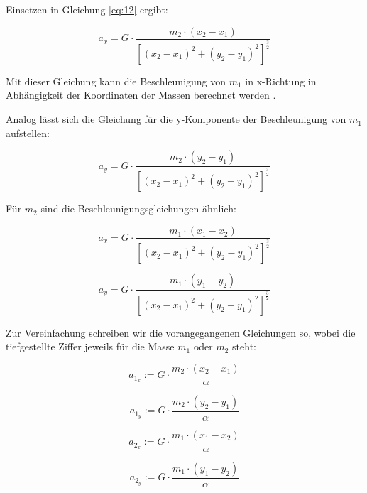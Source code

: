 \documentclass[10pt,twocolumn]{scrartcl}
\begin{document}
Einsetzen in Gleichung \eqref{eq:12} ergibt:

\begin{equation}a_x = G \cdot \frac{m_2 \cdot (x_2 - x_1)}
									{[(x_2-x_1)^2 + (y_2-y_1)^2]^\frac{3}{2}}
\label{eq:14}
\end{equation}

Mit dieser Gleichung kann die Beschleunigung von $m_1$ in x-Richtung in Abhängigkeit der Koordinaten der Massen berechnet werden \cite{MicrosoftOJ}.

Analog lässt sich die Gleichung für die y-Komponente der Beschleunigung von $m_1$ aufstellen:

\begin{equation}a_y = G \cdot \frac{m_2 \cdot (y_2 - y_1)}
									{[(x_2-x_1)^2 + (y_2-y_1)^2]^\frac{3}{2}}
\label{eq:15}
\end{equation}

Für $m_2$ sind die Beschleunigungsgleichungen ähnlich:

\begin{equation}a_x = G \cdot \frac{m_1 \cdot (x_1 - x_2)}
								{[(x_2-x_1)^2 + (y_2-y_1)^2]^\frac{3}{2}}
\label{eq:16}
\end{equation}

\begin{equation}a_y = G \cdot \frac{m_1 \cdot (y_1 - y_2)}
									{[(x_2-x_1)^2 + (y_2-y_1)^2]^\frac{3}{2}}
\label{eq:17}
\end{equation}

Zur Vereinfachung schreiben wir die vorangegangenen Gleichungen so, wobei die tiefgestellte Ziffer jeweils für die Masse $m_1$ oder $m_2$ steht:

\begin{equation}a_{1_x} := G \cdot \frac{m_2 \cdot (x_2 - x_1)}
			{\alpha}
\label{eq:18}
\end{equation}

\begin{equation}a_{1_y} := G \cdot \frac{m_2 \cdot (y_2 - y_1)}
			{\alpha}
\label{eq:19}
\end{equation}

\begin{equation}a_{2_x} := G \cdot \frac{m_1 \cdot (x_1 - x_2)}
			{\alpha}
\label{eq:20}
\end{equation}

\begin{equation}a_{2_y} := G \cdot \frac{m_1 \cdot (y_1 - y_2)}
			{\alpha}
\label{eq:21}
\end{equation}
\end{document}
